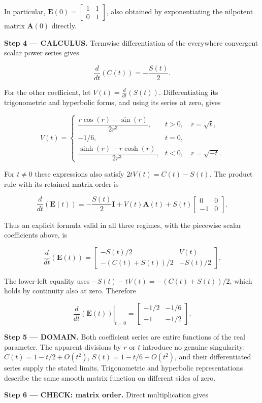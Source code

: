 \documentclass[11pt,oneside,openany]{book}
\begin{document}
In particular, \(\mathbf E(0)=\begin{bmatrix}1&1\\0&1\end{bmatrix}\), also obtained by exponentiating the nilpotent matrix \(\mathbf A(0)\) directly.

\endgroup
\textbf{Step 4 --- CALCULUS.} Termwise differentiation of the everywhere convergent scalar power series gives

\[
\frac{d}{dt}\left(C(t)\right)=-\frac{S(t)}2.
\]

For the other coefficient, let \(V(t)=\frac{d}{dt}(S(t))\). Differentiating its trigonometric and hyperbolic forms, and using its series at zero, gives

\[
V(t)=
\begin{cases}
\dfrac{r\cos(r)-\sin(r)}{2r^3},&t>0,\quad r=\sqrt t,\\
-1/6,&t=0,\\
\dfrac{\sinh(r)-r\cosh(r)}{2r^3},&t<0,\quad r=\sqrt{-t}.
\end{cases}
\]

For \(t\ne0\) these expressions also satisfy \(2tV(t)=C(t)-S(t)\). The product rule with its retained matrix order is

\[
\frac{d}{dt}\left(\mathbf E(t)\right)
=-\frac{S(t)}2\mathbf I+V(t)\mathbf A(t)
+S(t)\begin{bmatrix}0&0\\-1&0\end{bmatrix}.
\]

Thus an explicit formula valid in all three regimes, with the piecewise scalar coefficients above, is

\[
\frac{d}{dt}\left(\mathbf E(t)\right)
=\begin{bmatrix}
-S(t)/2&V(t)\\
-(C(t)+S(t))/2&-S(t)/2
\end{bmatrix}.
\]

The lower-left equality uses \(-S(t)-tV(t)=-(C(t)+S(t))/2\), which holds by continuity also at zero. Therefore

\[
\left.\frac{d}{dt}\left(\mathbf E(t)\right)\right|_{t=0}
=\begin{bmatrix}-1/2&-1/6\\-1&-1/2\end{bmatrix}.
\]

\begin{DomainStep}
\textbf{Step 5 --- DOMAIN.} Both coefficient series are entire functions of the real parameter. The apparent divisions by \(r\) or \(t\) introduce no genuine singularity: \(C(t)=1-t/2+O(t^2)\), \(S(t)=1-t/6+O(t^2)\), and their differentiated series supply the stated limits. Trigonometric and hyperbolic representations describe the same smooth matrix function on different sides of zero.

\end{DomainStep}
\textbf{Step 6 --- CHECK: matrix order.} Direct multiplication gives
\end{document}
